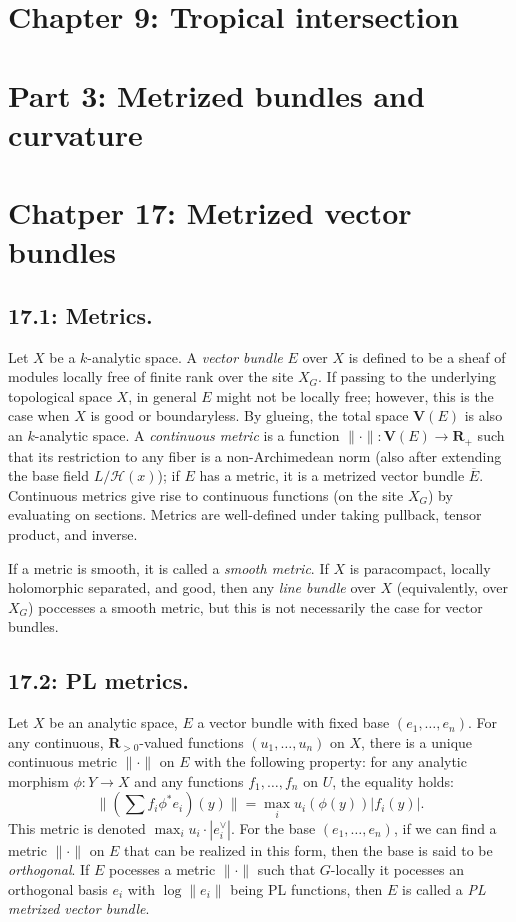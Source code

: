 \documentclass[12pt,reqno]{amsart}
\theoremstyle{definition}
\theoremstyle{remark}
\theoremstyle{citedrem}
\theoremstyle{cited}
\theoremstyle{citeddef}
\theoremstyle{step}
\begin{document}
\section*{Chapter 9: Tropical intersection}

\section*{Part 3: Metrized bundles and curvature}

\section*{Chatper 17: Metrized vector bundles}
\subsection*{17.1: Metrics. }Let $X$ be a $k$-analytic space. A \emph{vector bundle} $E$ over $X$ is defined to be a sheaf of modules locally free of finite rank over the site $X_G$. If passing to the underlying topological space $X$, in general $E$ might not be locally free; however, this is the case when $X$ is good or boundaryless. By glueing, the total space $\mathbf{V}(E)$ is also an $k$-analytic space. A \emph{continuous metric} is a function $\|\cdot\| \colon \mathbf{V}(E) \to \mathbf{R}_+$ such that its restriction to any fiber is a non-Archimedean norm (also after extending the base field $L / \mathcal{H}(x)$); if $E$ has a metric, it is a metrized vector bundle $\overline{E}$. Continuous metrics give rise to continuous functions (on the site $X_G$) by evaluating on sections. Metrics are well-defined under taking pullback, tensor product, and inverse. 

If a metric is smooth, it is called a \emph{smooth metric}. If $X$ is paracompact, locally holomorphic separated, and good, then any \emph{line bundle} over $X$ (equivalently, over $X_G$) poccesses a smooth metric, but this is not necessarily the case for vector bundles.  

\subsection*{17.2: PL metrics. }
Let $X$ be an analytic space, $E$ a vector bundle with fixed base $(e_1, \ldots, e_n)$. For any continuous, $\mathbf{R}_{>0}$-valued functions $(u_1, \ldots, u_n)$ on $X$, there is a unique continuous metric $\| \cdot \|$ on $E$ with the following property: for any analytic morphism $\phi \colon Y \to X$ and any functions $f_1, \ldots, f_n$ on $U$, the equality holds: 
\[\| (\sum f_i \phi^* e_i)(y)\| = \max_i u_i(\phi(y)) |f_i(y)|.\] This metric is denoted $\max_i u_i \cdot |e_i^\vee|.$ For the base $(e_1, \ldots, e_n)$, if we can find a metric $\| \cdot \|$ on $E$ that can be realized in this form, then the base is said to be \emph{orthogonal}. If $E$ pocesses a metric $\| \cdot \|$ such that $G$-locally it pocesses an orthogonal basis $e_i$ with $\log\|e_i\|$ being PL functions, then $E$ is called a \emph{PL metrized vector bundle}. 
\end{document}
